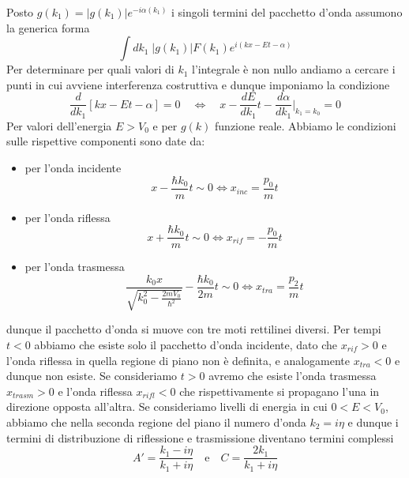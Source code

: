 \noindent Posto $g(k_1) = |g(k_1)|e^{-i\alpha(k_1)}$ i singoli termini del pacchetto d'onda assumono la generica forma 
\begin{equation*}
\int dk_1 \; |g(k_1)|F(k_1)e^{i(kx -Et - \alpha)}
\end{equation*}
Per determinare per quali valori di $k_1$ l'integrale \`e non nullo andiamo a cercare i punti in cui avviene interferenza costruttiva e dunque imponiamo la condizione
\begin{equation*}
	\frac{d}{dk_1} \left [ kx - Et - \alpha \right] = 0 \quad \iff \quad x-\frac{dE}{dk_1}t - \frac{d\alpha}{dk_1} \Big |_{k_1 = k_0} = 0
\end{equation*}
Per valori dell'energia $E > V_0$ e per $g(k)$ funzione reale. Abbiamo le condizioni sulle rispettive componenti sono date da: 
\begin{itemize}
	\item per l'onda incidente 
	\begin{equation*}
		x - \frac{\hbar k_0}{m}t \sim 0 \iff x_{inc} = \frac{p_0}{m}t
	\end{equation*}
	\item per l'onda riflessa 
	\begin{equation*}
		x + \frac{\hbar k_0}{m}t \sim 0 \iff x_{rif} = - \frac{p_0}{m}t 
	\end{equation*} 
	\item per l'onda trasmessa
	\begin{equation*}
		\frac{k_0x}{\sqrt{k_0^2 - \frac{2mV_0}{\hbar^2}}} - \frac{\hbar k_0}{2m}t \sim 0 \iff x_{tra} = \frac{p_2}{m}t
	\end{equation*}
\end{itemize}
dunque il pacchetto d'onda si muove con tre moti rettilinei diversi. Per tempi $t<0$ abbiamo che esiste solo il pacchetto d'onda incidente, dato che $x_{rif} > 0$ e l'onda riflessa in quella regione di piano non \`e definita, e analogamente $x_{tra} < 0$ e dunque non esiste. Se consideriamo $t > 0 $ avremo che esiste l'onda trasmessa $x_{trasm} > 0 $ e l'onda riflessa $x_{rifl} < 0$ che rispettivamente si propagano l'una in direzione opposta all'altra.
\newline
\noindent Se consideriamo livelli di energia in cui $0 < E < V_0$, abbiamo che nella seconda regione del piano il numero d'onda $k_2 = i \eta$ e dunque i termini di distribuzione di riflessione e trasmissione diventano termini complessi
\begin{equation*}
	A' = \frac{k_1 - i\eta}{k_1 +i \eta} \quad \text{e} \quad C = \frac{2k_1}{k_1 +i\eta}
\end{equation*}
